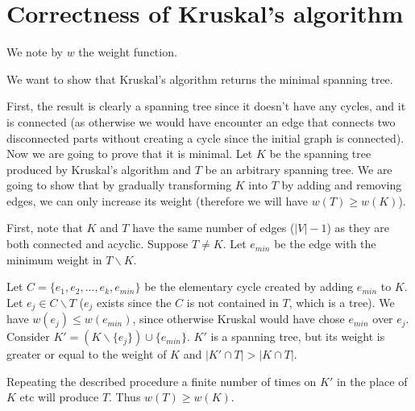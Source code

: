 \documentclass{article}
\begin{document}
\section{Correctness of Kruskal's algorithm}

We note by $w$ the weight function.

We want to show that Kruskal's algorithm returns the minimal spanning tree.

First, the result is clearly a spanning tree since it doesn't have any cycles, and it is connected (as otherwise we would have encounter an edge that connects two disconnected parts without creating a cycle since the initial graph is connected). Now we are going to prove that it is minimal. 
Let $K$ be the spanning tree produced by Kruskal's algorithm and $T$ be an arbitrary spanning tree. 
We are going to show that by gradually transforming $K$ into $T$ by adding and removing edges, we can only increase its weight (therefore we will have $w(T)\geq w(K)$).

First, note that $K$ and $T$ have the same number of edges ($|V|-1$) as they are both connected and acyclic. Suppose $T\neq K$. Let $e_{min}$ be the edge with the minimum weight in $T\backslash K$. 

Let $C = \{e_1,e_2,...,e_k,e_{min}\}$ be the elementary cycle created by adding $e_{min}$ to $K$. Let $e_j \in C \backslash T$ ($e_j$ exists since the $C$ is not contained in $T$, which is a tree). We have $w(e_j)\leq w(e_{min})$, since otherwise Kruskal would have chose $e_{min}$ over $e_j$. Consider $K' = (K\backslash \{e_j\})\cup\{e_{min}\}$. $K'$ is a spanning tree, but its weight is greater or equal to the weight of $K$ and $|K'\cap T| > |K \cap T|$. 

Repeating the described procedure a finite number of times on $K'$ in the place of $K$ etc will produce $T$. Thus $w(T)\geq w(K)$.
\end{document}
